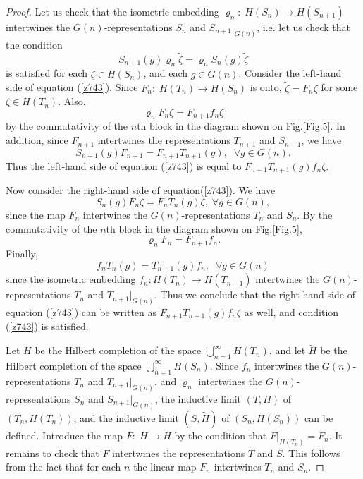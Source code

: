 \documentclass[12pt]{amsart}
\theoremstyle{definition}
\numberwithin{equation}{section}
\begin{document}
\begin{proof} Let us check that the isometric embedding $\varrho_n:\; H\left(S_n\right)\rightarrow H\left(S_{n+1}\right)$ intertwines the $G(n)$-representations $S_n$ and $S_{n+1}|_{G(n)}$, i.e. let us check that the condition
\begin{equation}\label{z743}
S_{n+1}(g)\varrho_n\tilde{\zeta}=\varrho_nS_n(g)\tilde{\zeta}
\end{equation}
is satisfied for each $\tilde{\zeta}\in H\left(S_n\right)$, and each $g\in G(n)$.
Consider the left-hand side of equation (\ref{z743}).
Since $F_n :\; H\left(T_n\right)\rightarrow H\left(S_n\right)$
is onto, $\tilde{\zeta}=F_n\zeta$ for some $\zeta\in H\left(T_n\right)$. Also,
$$
\varrho_nF_n\zeta=F_{n+1}f_n\zeta
$$
by the commutativity of the $n$th block in the diagram shown on Fig.\ref{Fig.5}. In addition, since $F_{n+1}$ intertwines the representations $T_{n+1}$ and $S_{n+1}$,
we have
$$
S_{n+1}(g)F_{n+1}=F_{n+1}T_{n+1}(g),\;\;\forall g\in G(n).
$$
Thus the left-hand side of equation (\ref{z743}) is equal to $F_{n+1}T_{n+1}(g)f_n\zeta$.

Now consider the right-hand side of equation(\ref{z743}). We have
$$
S_n(g)F_n\zeta=F_nT_n(g)\zeta,\;\forall g\in G(n),
$$
since the map $F_n$ intertwines the $G(n)$-representations $T_n$ and $S_n$. By the commutativity of the
$n$th block in the diagram shown on Fig.\ref{Fig.5},
$$
\varrho_nF_n=F_{n+1}f_n.
$$
Finally,
$$
f_nT_n(g)=T_{n+1}(g)f_n,\;\; \forall g\in G(n)
$$
since the isometric embedding $f_n: H\left(T_n\right)\rightarrow H\left(T_{n+1}\right)$ intertwines the $G(n)$-representations $T_n$ and $T_{n+1}|_{G(n)}$.
Thus we conclude that the right-hand side of equation (\ref{z743}) can be written as $F_{n+1}T_{n+1}(g)f_n\zeta$ as well, and condition (\ref{z743}) is satisfied.


Let $H$ be the Hilbert completion of the space $\bigcup_{n=1}^{\infty}H\left(T_n\right)$, and let $\tilde{H}$ be the Hilbert completion of the space
$\bigcup_{n=1}^{\infty}H\left(S_n\right)$.  Since $f_n$ intertwines the $G(n)$-representations  $T_n$ and $T_{n+1}|_{G(n)}$, and  $\varrho_n$ intertwines the $G(n)$-representations $S_n$ and $S_{n+1}|_{G(n)}$,
the inductive limit $(T,H)$ of $\left(T_n,H\left(T_n\right)\right)$, and
the inductive limit $(S,\tilde{H})$ of $\left(S_n,H\left(S_n\right)\right)$ can be defined. Introduce the map
$F:\; H\rightarrow\tilde{H}$ by the condition that $F|_{H\left(T_n\right)}=F_n$. It remains to check that $F$ intertwines the representations $T$ and $S$.
This follows from the fact that for each $n$ the linear map $F_n$ intertwines $T_n$ and $S_n$.
\end{proof}
\end{document}
